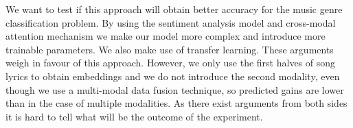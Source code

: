 We want to test if this approach will obtain better accuracy for the music genre classification problem. By using the sentiment analysis model and cross-modal attention mechanism we make our model more complex and introduce more trainable parameters. We also make use of transfer learning. These arguments weigh in favour of this approach. However, we only use the first halves of song lyrics to obtain embeddings and we do not introduce the second modality, even though we use a multi-modal data fusion technique, so predicted gains are lower than in the case of multiple modalities. As there exist arguments from both sides it is hard to tell what will be the outcome of the experiment.
